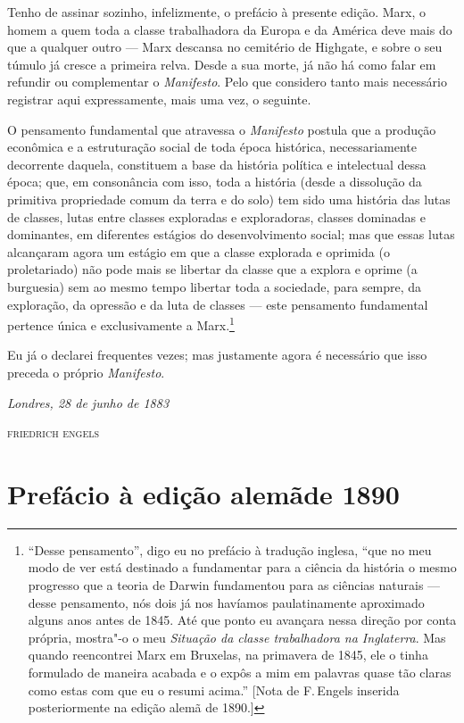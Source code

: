 Tenho de assinar sozinho, infelizmente, o prefácio à presente edição.
Marx, o homem a quem toda a classe trabalhadora da Europa e da América
deve mais do que a qualquer outro  ---  Marx descansa no cemitério de
Highgate, e sobre o seu túmulo já cresce a primeira relva. Desde a sua
morte, já não há como falar em refundir ou complementar o
\textit{Manifesto}. Pelo que considero tanto mais necessário registrar
aqui expressamente, mais uma vez, o seguinte.

O pensamento fundamental que atravessa o
\textit{Manifesto} postula que a produção econômica e
a estruturação social de toda época histórica, necessariamente
decorrente daquela, constituem a base da história política e
intelectual dessa época; que, em consonância com isso, toda a história
(desde a dissolução da primitiva propriedade comum da terra e do solo)
tem sido uma história das lutas de classes, lutas entre classes
exploradas e exploradoras, classes dominadas e dominantes, em
diferentes estágios do desenvolvimento social; mas que essas lutas
alcançaram agora um estágio em que a classe explorada e oprimida (o
proletariado) não pode mais se libertar da classe que a explora e
oprime (a burguesia) sem ao mesmo tempo libertar toda a sociedade, para
sempre, da exploração, da opressão e da luta de classes --- este
pensamento fundamental pertence única e exclusivamente a
Marx.\footnote{``Desse pensamento'', digo eu no prefácio à tradução inglesa, 
``que no meu modo de ver está destinado a fundamentar para a ciência da 
história o mesmo progresso que a teoria de Darwin fundamentou para as 
ciências naturais  ---  desse pensamento, nós dois já nos havíamos paulatinamente 
aproximado alguns anos antes de 1845. Até que ponto eu avançara nessa direção 
por conta própria, mostra"-o o meu \textit{Situação da classe
trabalhadora na Inglaterra}. Mas quando reencontrei Marx em Bruxelas,
na primavera de 1845, ele o tinha formulado de maneira acabada e o
expôs a mim em palavras quase tão claras como estas com que eu o resumi
acima.'' [Nota de F.\,Engels inserida posteriormente na edição alemã de
1890.]}

Eu já o declarei frequentes vezes; mas justamente agora é necessário que
isso preceda o próprio \mbox{\textit{Manifesto}}.

\bigskip

\hfill\textit{Londres, 28 de junho de 1883}

\hfill\textsc{friedrich engels}


\chapter[Prefácio à edição alemã de 1890]{Prefácio à edição alemã\break de 1890}

